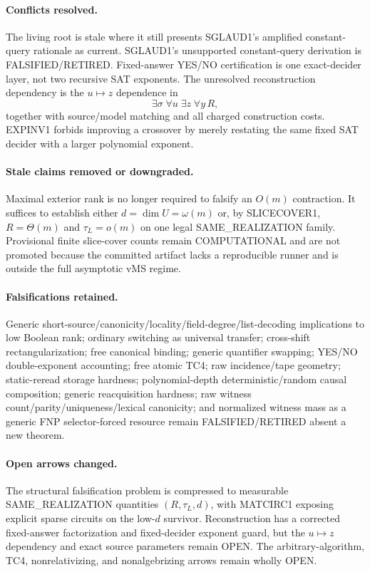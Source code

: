\documentclass[11pt]{article}
\begin{document}
\paragraph{Conflicts resolved.}
The living root is stale where it still presents SGLAUD1's amplified constant-query rationale as current. SGLAUD1's unsupported constant-query derivation is FALSIFIED/RETIRED. Fixed-answer YES/NO certification is one exact-decider layer, not two recursive SAT exponents. The unresolved reconstruction dependency is the \(u\mapsto z\) dependence in
\[
\exists\sigma\;\forall u\;\exists z\;\forall y\,R,
\]
together with source/model matching and all charged construction costs. EXPINV1 forbids improving a crossover by merely restating the same fixed SAT decider with a larger polynomial exponent.

\paragraph{Stale claims removed or downgraded.}
Maximal exterior rank is no longer required to falsify an \(O(m)\) contraction. It suffices to establish either \(d=\dim U=\omega(m)\) or, by SLICECOVER1, \(R=\Theta(m)\) and \(\tau_L=o(m)\) on one legal SAME\_REALIZATION family. Provisional finite slice-cover counts remain COMPUTATIONAL and are not promoted because the committed artifact lacks a reproducible runner and is outside the full asymptotic vMS regime.

\paragraph{Falsifications retained.}
Generic short-source/canonicity/locality/field-degree/list-decoding implications to low Boolean rank; ordinary switching as universal transfer; cross-shift rectangularization; free canonical binding; generic quantifier swapping; YES/NO double-exponent accounting; free atomic TC4; raw incidence/tape geometry; static-reread storage hardness; polynomial-depth deterministic/random causal composition; generic reacquisition hardness; raw witness count/parity/uniqueness/lexical canonicity; and normalized witness mass as a generic FNP selector-forced resource remain FALSIFIED/RETIRED absent a new theorem.

\paragraph{Open arrows changed.}
The structural falsification problem is compressed to measurable SAME\_REALIZATION quantities \((R,\tau_L,d)\), with MATCIRC1 exposing explicit sparse circuits on the low-\(d\) survivor. Reconstruction has a corrected fixed-answer factorization and fixed-decider exponent guard, but the \(u\mapsto z\) dependency and exact source parameters remain OPEN. The arbitrary-algorithm, TC4, nonrelativizing, and nonalgebrizing arrows remain wholly OPEN.
\end{document}
